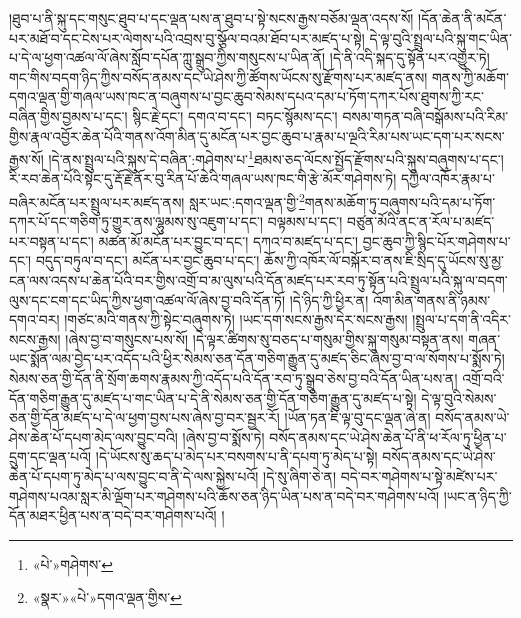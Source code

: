 །ཐུབ་པ་ནི་སྐུ་དང་གསུང་ཐུབ་པ་དང་ལྡན་པས་ན་ཐུབ་པ་སྟེ་སངས་རྒྱས་བཅོམ་ལྡན་འདས་སོ། །དོན་ཆེན་ནི་མངོན་པར་མཐོ་བ་དང་ངེས་པར་ལེགས་པའི་འབྲས་བུ་སྩོལ་བའམ་ཐོབ་པར་མཛད་པ་སྟེ། དེ་ལྟ་བུའི་སྤྲུལ་པའི་སྐུ་གང་ཡིན་པ་དེ་ལ་ཕྱག་འཚལ་ལོ་ཞེས་སློབ་དཔོན་ཀླུ་སྒྲུབ་ཀྱིས་གསུངས་པ་ཡིན་ནོ། །དེ་ནི་འདི་སྐད་དུ་སྟོན་པར་འགྱུར་ཏེ། གང་གིས་བདག་ཉིད་ཀྱིས་བསོད་ནམས་དང་ཡེ་ཤེས་ཀྱི་ཚོགས་ཡོངས་སུ་རྫོགས་པར་མཛད་ནས། གནས་ཀྱི་མཆོག་དགའ་ལྡན་གྱི་གཞལ་ཡས་ཁང་ན་བཞུགས་པ་བྱང་ཆུབ་སེམས་དཔའ་དམ་པ་ཏོག་དཀར་པོས་ཐུགས་ཀྱི་རང་བཞིན་གྱིས་བྱམས་པ་དང་། སྙིང་རྗེ་དང་། དགའ་བ་དང་། བཏང་སྙོམས་དང་། བསམ་གཏན་བཞི་བསྒོམས་པའི་རིམ་གྱིས་རྣལ་འབྱོར་ཆེན་པོའི་གནས་འོག་མིན་དུ་མངོན་པར་བྱང་ཆུབ་པ་རྣམ་པ་ལྔའི་རིམ་པས་ཡང་དག་པར་སངས་རྒྱས་སོ། །དེ་ནས་སྤྲུལ་པའི་སྐུས་དེ་བཞིན་:གཤེགས་པ་\footnote{«པེ་»གཤེགས་}ཐམས་ཅད་ལོངས་སྤྱོད་རྫོགས་པའི་སྐུས་བཞུགས་པ་དང་། རི་རབ་ཆེན་པོའི་སྟེང་དུ་རྡོ་རྗེ་ནོར་བུ་རིན་པོ་ཆེའི་གཞལ་ཡས་ཁང་གི་རྩེ་མོར་གཤེགས་ཏེ། དཀྱིལ་འཁོར་རྣམ་པ་བཞིར་མངོན་པར་སྤྲུལ་པར་མཛད་ནས། སླར་ཡང་:དགའ་ལྡན་གྱི་\footnote{«སྣར་»«པེ་»དགའ་ལྡན་གྱིས་}གནས་མཆོག་ཏུ་བཞུགས་པའི་དམ་པ་ཏོག་དཀར་པོ་དང་གཅིག་ཏུ་གྱུར་ནས་ལྷུམས་སུ་འཇུག་པ་དང་། བལྟམས་པ་དང་། བཙུན་མོའི་ནང་ན་རོལ་པ་མཛད་པར་བསྟན་པ་དང་། མཚན་མོ་མངོན་པར་བྱུང་བ་དང་། དཀའ་བ་མཛད་པ་དང་། བྱང་ཆུབ་ཀྱི་སྙིང་པོར་གཤེགས་པ་དང་། བདུད་བཏུལ་བ་དང་། མངོན་པར་བྱང་ཆུབ་པ་དང་། ཆོས་ཀྱི་འཁོར་ལོ་བསྐོར་བ་ནས་ཇི་སྲིད་དུ་ཡོངས་སུ་མྱ་ངན་ལས་འདས་པ་ཆེན་པོའི་བར་གྱིས་འགྲོ་བ་མ་ལུས་པའི་དོན་མཛད་པར་རབ་ཏུ་སྟོན་པའི་སྤྲུལ་པའི་སྐུ་ལ་བདག་ལུས་དང་ངག་དང་ཡིད་ཀྱིས་ཕྱག་འཚལ་ལོ་ཞེས་བྱ་བའི་དོན་ཏོ། །དེ་ཉིད་ཀྱི་ཕྱིར་ན། འོག་མིན་གནས་ནི་ཉམས་དགའ་བར། །གཙང་མའི་གནས་ཀྱི་སྟེང་བཞུགས་ཏེ། །ཡང་དག་སངས་རྒྱས་དེར་སངས་རྒྱས། །སྤྲུལ་པ་དག་ནི་འདིར་སངས་རྒྱས། །ཞེས་བྱ་བ་གསུངས་པས་སོ། །དེ་ལྟར་ཚིགས་སུ་བཅད་པ་གསུམ་གྱིས་སྐུ་གསུམ་བསྟན་ནས། གཞན་ཡང་སྨོན་ལམ་བྱེད་པར་འདོད་པའི་ཕྱིར་སེམས་ཅན་དོན་གཅིག་རྒྱུན་དུ་མཛད་ཅིང་ཞེས་བྱ་བ་ལ་སོགས་པ་སྨོས་ཏེ། སེམས་ཅན་གྱི་དོན་ནི་སྲོག་ཆགས་རྣམས་ཀྱི་འདོད་པའི་དོན་རབ་ཏུ་སྒྲུབ་ཅེས་བྱ་བའི་དོན་ཡིན་པས་ན། འགྲོ་བའི་དོན་གཅིག་རྒྱུན་དུ་མཛད་པ་གང་ཡིན་པ་དེ་ནི་སེམས་ཅན་གྱི་དོན་གཅིག་རྒྱུན་དུ་མཛད་པ་སྟེ། དེ་ལྟ་བུའི་སེམས་ཅན་གྱི་དོན་མཛད་པ་དེ་ལ་ཕྱག་བྱས་པས་ཞེས་བྱ་བར་སྦྱར་རོ། །ཡོན་ཏན་ཇི་ལྟ་བུ་དང་ལྡན་ཞེ་ན། བསོད་ནམས་ཡེ་ཤེས་ཆེན་པོ་དཔག་མེད་ལས་བྱུང་བའི། །ཞེས་བྱ་བ་སྨོས་ཏེ། བསོད་ནམས་དང་ཡེ་ཤེས་ཆེན་པོ་ནི་ཕ་རོལ་ཏུ་ཕྱིན་པ་དྲུག་དང་ལྡན་པའོ། །དེ་ཡོངས་སུ་ཆད་པ་མེད་པར་བསགས་པ་ནི་དཔག་ཏུ་མེད་པ་སྟེ། བསོད་ནམས་དང་ཡེ་ཤེས་ཆེན་པོ་དཔག་ཏུ་མེད་པ་ལས་བྱུང་བ་ནི་དེ་ལས་སྐྱེས་པའོ། །དེ་སུ་ཞིག་ཅེ་ན། བདེ་བར་གཤེགས་པ་སྟེ་མཛེས་པར་གཤེགས་པའམ་སླར་མི་ལྡོག་པར་གཤེགས་པའི་ཆོས་ཅན་ཉིད་ཡིན་པས་ན་བདེ་བར་གཤེགས་པའོ། །ཡང་ན་ཉིད་ཀྱི་དོན་མཐར་ཕྱིན་པས་ན་བདེ་བར་གཤེགས་པའོ། །
